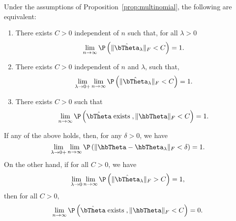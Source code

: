 \begin{lemma}
\label{lemma:equivalence_multinomial}
Under the assumptions of Proposition~\ref{prop:multinomial}, 
the following are equivalent:
\begin{enumerate}
 \item There exists $C>0$ independent of $n$  such that, for all $\lambda>0$ 
    \begin{equation}
     \lim_{n\to\infty} \P\left(\|\hat\bTheta_\lambda\|_F < C \right) = 1.
    \end{equation}
    \item There exists $C>0$ independent of $n$ and $\lambda$, such that, 
    \begin{equation}
        \lim_{\lambda \to 0+} \lim_{n\to\infty} \P\left(\|\hat\bTheta_\lambda\|_F < C \right) = 1.
    \end{equation}
\item There exists $C>0$ such that
    \begin{equation}
         \lim_{n\to\infty} \P\left( \hat\bTheta \;\mbox{\rm exists}\;,\|\hbTheta\|_F 
 < C\right) = 1.
    \end{equation}
\end{enumerate}
%
If any of the above holds, then, for any $\delta>0$, we have
 \begin{equation}
        \lim_{\lambda \to 0+} \lim_{n\to\infty} \P\left(\|\hbTheta-\hbTheta_\lambda\|_F < \delta \right) = 1.\label{eq:LambdaPerturbation}
    \end{equation}
On the other hand, if for all $C>0$, we have
    \begin{equation}
    \label{eq:diverging_in_lambda}
        \lim_{\lambda \to 0} \lim_{n\to\infty} \P\left(\|\hat\bTheta_\lambda\|_F > C\right) = 1,
    \end{equation}
    then for all $C>0,$
    \begin{equation}
    \label{eq:any_seq_minimzers_diverges}
         \lim_{n\to\infty} \P\left( \hat\bTheta \;\mbox{\rm exists}\;,\|\hbTheta\|_F 
 < C\right) = 0.
    \end{equation}
\end{lemma}
